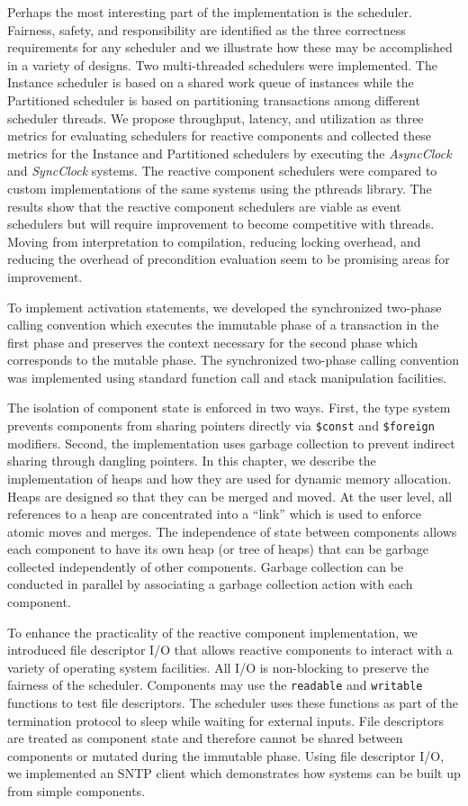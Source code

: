 Perhaps the most interesting part of the implementation is the scheduler.
Fairness, safety, and responsibility are identified as the three correctness requirements for any scheduler and we illustrate how these may be accomplished in a variety of designs.
Two multi-threaded schedulers were implemented.
The Instance scheduler is based on a shared work queue of instances while the Partitioned scheduler is based on partitioning transactions among different scheduler threads.
We propose throughput, latency, and utilization as three metrics for evaluating schedulers for reactive components and collected these metrics for the Instance and Partitioned schedulers by executing the \emph{AsyncClock} and \emph{SyncClock} systems.
The reactive component schedulers were compared to custom implementations of the same systems using the pthreads library.
The results show that the reactive component schedulers are viable as event schedulers but will require improvement to become competitive with threads.
Moving from interpretation to compilation, reducing locking overhead, and reducing the overhead of precondition evaluation seem to be promising areas for improvement.

To implement activation statements, we developed the synchronized two-phase calling convention which executes the immutable phase of a transaction in the first phase and preserves the context necessary for the second phase which corresponds to the mutable phase.
The synchronized two-phase calling convention was implemented using standard function call and stack manipulation facilities.

The isolation of component state is enforced in two ways.
First, the type system prevents components from sharing pointers directly via \verb+$const+ and \verb+$foreign+ modifiers.
Second, the implementation uses garbage collection to prevent indirect sharing through dangling pointers.
In this chapter, we describe the implementation of heaps and how they are used for dynamic memory allocation.
Heaps are designed so that they can be merged and moved.
At the user level, all references to a heap are concentrated into a ``link'' which is used to enforce atomic moves and merges.
The independence of state between components allows each component to have its own heap (or tree of heaps) that can be garbage collected independently of other components.
Garbage collection can be conducted in parallel by associating a garbage collection action with each component.

To enhance the practicality of the reactive component implementation, we introduced file descriptor I/O that allows reactive components to interact with a variety of operating system facilities.
All I/O is non-blocking to preserve the fairness of the scheduler.
Components may use the \verb+readable+ and \verb+writable+ functions to test file descriptors.
The scheduler uses these functions as part of the termination protocol to sleep while waiting for external inputs.
File descriptors are treated as component state and therefore cannot be shared between components or mutated during the immutable phase.
Using file descriptor I/O, we implemented an SNTP client which demonstrates how systems can be built up from simple components.

